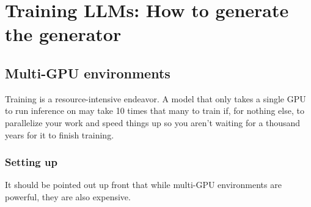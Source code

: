 \chapter{Training LLMs: How to generate the generator}

\section{Multi-GPU environments}
Training is a resource-intensive endeavor. A model that only takes a single GPU to run inference on may take 10 times that many to train if, for nothing else, to parallelize your work and speed things up so you aren't waiting for a thousand years for it to finish training.  

\subsection{Setting up} 
It should be pointed out up front that while multi-GPU environments are powerful, they are also expensive. 
